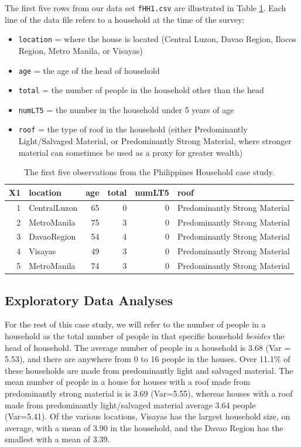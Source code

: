 \documentclass[
]{krantz}
\providecommand{\tightlist}{%
  \setlength{\itemsep}{0pt}\setlength{\parskip}{0pt}}
\begin{document}
The first five rows from our data set \texttt{fHH1.csv} are illustrated in Table \ref{tab:fHH1table1}. Each line of the data file refers to a household at the time of the survey:

\begin{itemize}
\tightlist
\item
  \texttt{location} = where the house is located (Central Luzon, Davao Region, Ilocos Region, Metro Manila, or Visayas)
\item
  \texttt{age} = the age of the head of household
\item
  \texttt{total} = the number of people in the household other than the head
\item
  \texttt{numLT5} = the number in the household under 5 years of age
\item
  \texttt{roof} = the type of roof in the household (either Predominantly Light/Salvaged Material, or Predominantly Strong Material, where stronger material can sometimes be used as a proxy for greater wealth)
\end{itemize}

\begin{table}

\caption{\label{tab:fHH1table1}The first five observations from the Philippines Household case study.}
\centering
\begin{tabular}[t]{rlrrrl}
\toprule
X1 & location & age & total & numLT5 & roof\\
\midrule
1 & CentralLuzon & 65 & 0 & 0 & Predominantly Strong Material\\
2 & MetroManila & 75 & 3 & 0 & Predominantly Strong Material\\
3 & DavaoRegion & 54 & 4 & 0 & Predominantly Strong Material\\
4 & Visayas & 49 & 3 & 0 & Predominantly Strong Material\\
5 & MetroManila & 74 & 3 & 0 & Predominantly Strong Material\\
\bottomrule
\end{tabular}
\end{table}

\hypertarget{exploreHH}{%
\subsection{Exploratory Data Analyses}\label{exploreHH}}

For the rest of this case study, we will refer to the number of people in a household as the total number of people in that specific household \emph{besides} the head of household. The average number of people in a household is 3.68 (Var = 5.53), and there are anywhere from 0 to 16 people in the houses. Over 11.1\% of these households are made from predominantly light and salvaged material. The mean number of people in a house for houses with a roof made from predominantly strong material is is 3.69 (Var=5.55), whereas houses with a roof made from predominantly light/salvaged material average 3.64 people (Var=5.41). Of the various locations, Visayas has the largest household size, on average, with a mean of 3.90 in the household, and the Davao Region has the smallest with a mean of 3.39.
\end{document}
